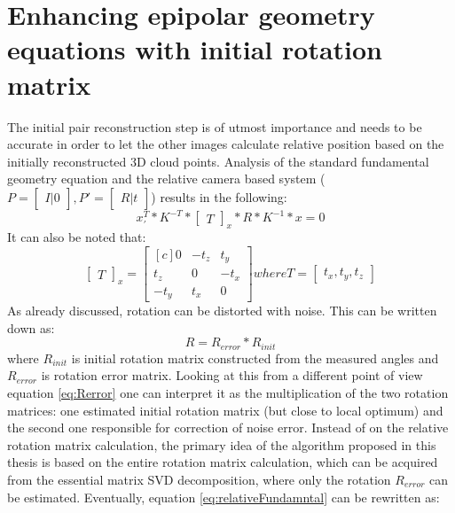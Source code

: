 \section{Enhancing epipolar geometry equations with initial rotation matrix} \label{sec:EpipolarEquation}
The initial pair reconstruction step is of utmost importance and needs to be accurate in order to let the other images calculate relative position based on the initially reconstructed 3D cloud points.
Analysis of the standard fundamental geometry equation and the relative camera based system ($P = \begin{bmatrix}I |0\end{bmatrix}, P' = \begin{bmatrix}R|t\end{bmatrix}$) results in the following:
\begin{equation} \label{eq:relativeFundamntal}
{x}_{'}^{T} * K^{-T} * \begin{bmatrix}T\end{bmatrix}_{x} * R * K^{-1} * x = 0
\end{equation}
It can also be noted that:
\begin{equation} \label{eq:skewTranslation}
\begin{bmatrix}T\end{bmatrix}_{x} = 
\begin{bmatrix*}[c]
 0 & -t_{z} & t_{y}\\
 t_{z} & 0 & -t_{x}\\
-t_{y} & t_{x} & 0 
\end{bmatrix*} 
where T = \begin{bmatrix}t_{x},t_{y},t_{z}\end{bmatrix}
\end{equation}
As already discussed, rotation can be distorted with noise. This can be written down as:
\begin{equation} \label{eq:Rerror}
R = R_{error} * R_{init} 
\end{equation}
where $R_{init}$ is initial rotation matrix constructed from the measured angles and $R_{error}$ is rotation error matrix.
Looking at this from a different point of view equation \ref{eq:Rerror} one can interpret it as the multiplication of the two rotation matrices: 
one estimated initial rotation matrix (but close to local optimum) and the second one responsible for correction of noise error. 
Instead of on the relative rotation matrix calculation, the primary idea of the algorithm proposed in this thesis is based on the entire rotation matrix calculation, which can be acquired from the essential matrix SVD decomposition, where only the rotation $R_{error}$ can be estimated. Eventually, equation \ref{eq:relativeFundamntal} can be rewritten as:
